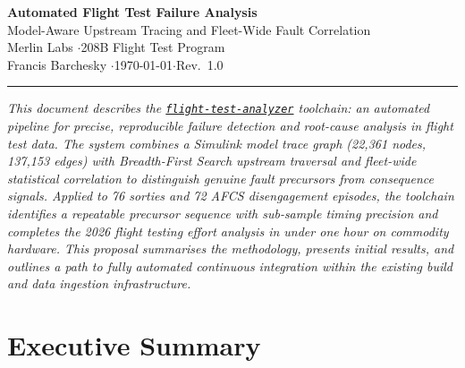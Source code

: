 \documentclass[11pt, letterpaper]{article}
\newcommand{\repoFTA}{\href{https://github.com/francis-barchesky/flight-test-analyzer}{\texttt{flight-test-analyzer}}}
\begin{document}

\begin{center}
  {\LARGE\bfseries Automated Flight Test Failure Analysis} \\[0.5em]
  {\large Model-Aware Upstream Tracing and Fleet-Wide Fault Correlation} \\[1.2em]
  {\normalsize Merlin Labs \quad$\cdot$\quad 208B Flight Test Program} \\[0.3em]
  {\small Francis Barchesky \quad$\cdot$\quad \today \quad$\cdot$\quad Rev.\ 1.0}
\end{center}

\vspace{1em}
\hrule
\vspace{1.5em}


\begin{center}
\begin{minipage}{0.88\textwidth}
\small\textit{%
This document describes the \repoFTA{} toolchain: an automated
pipeline for precise, reproducible failure detection and root-cause analysis in
flight test data. The system combines a Simulink model trace graph
(22{,}361 nodes, 137{,}153 edges) with Breadth-First Search upstream traversal
and fleet-wide statistical correlation to distinguish genuine fault precursors
from consequence signals. Applied to 76 sorties and 72 AFCS disengagement
episodes, the toolchain identifies a repeatable precursor sequence with
sub-sample timing precision and completes the 2026 flight testing effort analysis in under
one hour on commodity hardware. This proposal summarises the methodology,
presents initial results, and outlines a path to fully automated continuous
integration within the existing build and data ingestion infrastructure.}
\end{minipage}
\end{center}

\vspace{1.5em}

\section*{Executive Summary}
\end{document}
